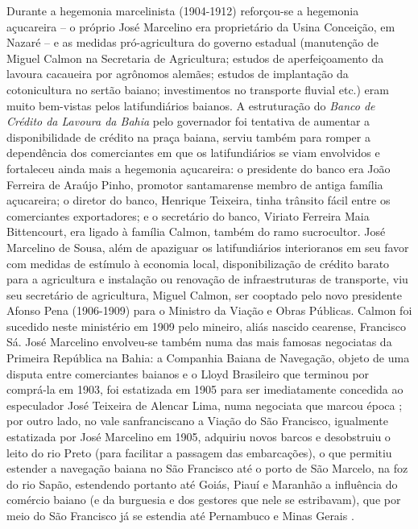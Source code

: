 Durante a hegemonia marcelinista (1904-1912) reforçou-se a hegemonia açucareira -- o próprio José Marcelino era proprietário da Usina Conceição, em Nazaré -- e as medidas pró-agricultura do governo estadual (manutenção de Miguel Calmon na Secretaria de Agricultura; estudos de aperfeiçoamento da lavoura cacaueira por agrônomos alemães; estudos de implantação da cotonicultura no sertão baiano; investimentos no transporte fluvial etc.) eram muito bem-vistas pelos latifundiários baianos. A estruturação do \textit{Banco de Crédito da Lavoura da Bahia} pelo governador foi tentativa de aumentar a disponibilidade de crédito na praça baiana, serviu também para romper a dependência dos comerciantes em que os latifundiários se viam envolvidos e fortaleceu ainda mais a hegemonia açucareira: o presidente do banco era João Ferreira de Araújo Pinho, promotor santamarense membro de antiga família açucareira; o diretor do banco, Henrique Teixeira, tinha trânsito fácil entre os comerciantes exportadores; e o secretário do banco, Viriato Ferreira Maia Bittencourt, era ligado à família Calmon, também do ramo sucrocultor. José Marcelino de Sousa, além de apaziguar os latifundiários interioranos em seu favor com medidas de estímulo à economia local, disponibilização de crédito barato para a agricultura e instalação ou renovação de infraestruturas de transporte, viu seu secretário de agricultura, Miguel Calmon, ser cooptado pelo novo presidente Afonso Pena (1906-1909) para o Ministro da Viação e Obras Públicas. Calmon foi sucedido neste ministério em 1909 pelo mineiro, aliás nascido cearense, Francisco Sá. José Marcelino envolveu-se também numa das mais famosas negociatas da Primeira República na Bahia: a Companhia Baiana de Navegação, objeto de uma disputa entre comerciantes baianos e o Lloyd Brasileiro que terminou por comprá-la em 1903, foi estatizada em 1905 para ser imediatamente concedida ao especulador José Teixeira de Alencar Lima, numa negociata que marcou época \cite[p.~220]{CUNHA2011}; por outro lado, no vale sanfranciscano a Viação do São Francisco, igualmente estatizada por José Marcelino em 1905, adquiriu novos barcos e desobstruiu o leito do rio Preto (para facilitar a passagem das embarcações), o que permitiu estender a navegação baiana no São Francisco até o porto de São Marcelo, na foz do rio Sapão, estendendo portanto até Goiás, Piauí e Maranhão a influência do comércio baiano (e da burguesia e dos gestores que nele se estribavam), que por meio do São Francisco já se estendia até Pernambuco e Minas Gerais \cite[p.~220-221]{CUNHA2011}.

